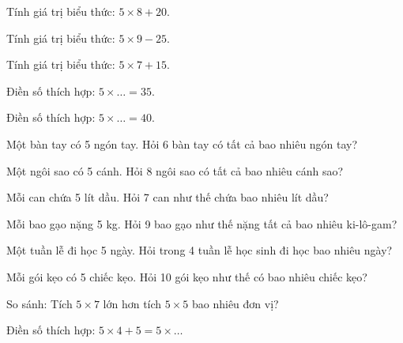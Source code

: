 \begin{ex}
Tính giá trị biểu thức: $5 \times 8 + 20$.
\end{ex}

\begin{ex}
Tính giá trị biểu thức: $5 \times 9 - 25$.
\end{ex}

\begin{ex}
Tính giá trị biểu thức: $5 \times 7 + 15$.
\end{ex}

\begin{ex}
Điền số thích hợp: $5 \times \dots = 35$.
\end{ex}

\begin{ex}
Điền số thích hợp: $5 \times \dots = 40$.
\end{ex}

\begin{ex}
Một bàn tay có 5 ngón tay. Hỏi 6 bàn tay có tất cả bao nhiêu ngón tay?
\end{ex}

\begin{ex}
Một ngôi sao có 5 cánh. Hỏi 8 ngôi sao có tất cả bao nhiêu cánh sao?
\end{ex}

\begin{ex}
Mỗi can chứa 5 lít dầu. Hỏi 7 can như thế chứa bao nhiêu lít dầu?
\end{ex}

\begin{ex}
Mỗi bao gạo nặng 5 kg. Hỏi 9 bao gạo như thế nặng tất cả bao nhiêu ki-lô-gam?
\end{ex}

\begin{ex}
Một tuần lễ đi học 5 ngày. Hỏi trong 4 tuần lễ học sinh đi học bao nhiêu ngày?
\end{ex}

\begin{ex}
Mỗi gói kẹo có 5 chiếc kẹo. Hỏi 10 gói kẹo như thế có bao nhiêu chiếc kẹo?
\end{ex}

\begin{ex}
So sánh: Tích $5 \times 7$ lớn hơn tích $5 \times 5$ bao nhiêu đơn vị?
\end{ex}

\begin{ex}
Điền số thích hợp: $5 \times 4 + 5 = 5 \times \dots$
\end{ex}
